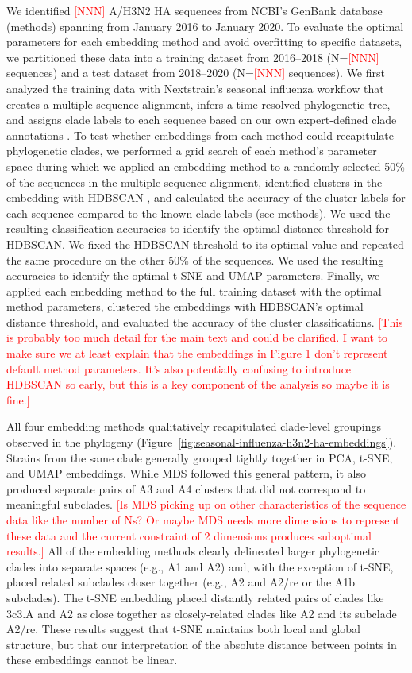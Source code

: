 \documentclass[9pt,lineno]{elife}
\def\jhc#1{\textcolor{red}{[#1]}}
\begin{document}
We identified \jhc{NNN} A/H3N2 HA sequences from NCBI's GenBank database (methods) spanning from January 2016 to January 2020.
To evaluate the optimal parameters for each embedding method and avoid overfitting to specific datasets, we partitioned these data into a training dataset from 2016--2018 (N=\jhc{NNN} sequences) and a test dataset from 2018--2020 (N=\jhc{NNN} sequences).
We first analyzed the training data with Nextstrain's seasonal influenza workflow that creates a multiple sequence alignment, infers a time-resolved phylogenetic tree, and assigns clade labels to each sequence based on our own expert-defined clade annotations \citep{nextstrain,seasonal-flu,augur}.
To test whether embeddings from each method could recapitulate phylogenetic clades, we performed a grid search of each method's parameter space during which we applied an embedding method to a randomly selected 50\% of the sequences in the multiple sequence alignment, identified clusters in the embedding with HDBSCAN \citep{hdbscan}, and calculated the accuracy of the cluster labels for each sequence compared to the known clade labels (see methods).
We used the resulting classification accuracies to identify the optimal distance threshold for HDBSCAN.
We fixed the HDBSCAN threshold to its optimal value and repeated the same procedure on the other 50\% of the sequences.
We used the resulting accuracies to identify the optimal t-SNE and UMAP parameters.
Finally, we applied each embedding method to the full training dataset with the optimal method parameters, clustered the embeddings with HDBSCAN's optimal distance threshold, and evaluated the accuracy of the cluster classifications.
\jhc{This is probably too much detail for the main text and could be clarified. I want to make sure we at least explain that the embeddings in Figure 1 don't represent default method parameters. It's also potentially confusing to introduce HDBSCAN so early, but this is a key component of the analysis so maybe it is fine.}

All four embedding methods qualitatively recapitulated clade-level groupings observed in the phylogeny (Figure~\ref{fig:seasonal-influenza-h3n2-ha-embeddings}).
Strains from the same clade generally grouped tightly together in PCA, t-SNE, and UMAP embeddings.
While MDS followed this general pattern, it also produced separate pairs of A3 and A4 clusters that did not correspond to meaningful subclades.
\jhc{Is MDS picking up on other characteristics of the sequence data like the number of Ns? Or maybe MDS needs more dimensions to represent these data and the current constraint of 2 dimensions produces suboptimal results.}
All of the embedding methods clearly delineated larger phylogenetic clades into separate spaces (e.g., A1 and A2) and, with the exception of t-SNE, placed related subclades closer together (e.g., A2 and A2/re or the A1b subclades).
The t-SNE embedding placed distantly related pairs of clades like 3c3.A and A2 as close together as closely-related clades like A2 and its subclade A2/re.
These results suggest that t-SNE maintains both local and global structure, but that our interpretation of the absolute distance between points in these embeddings cannot be linear.
\end{document}
